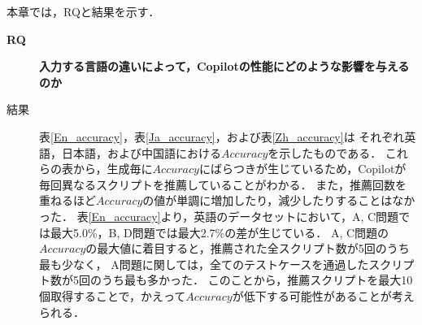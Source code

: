   \begin{table}[t]
    \centering
    \caption{中国語における$Accuracy$}
    \label{Zh_accuracy}
  \end{table}

  本章では，RQと結果を示す．
  \begin{description}
    \item[\textbf{RQ}] \textbf{入力する言語の違いによって，Copilotの性能にどのような影響を与えるのか}
      \item[結果]
      表\ref{En_accuracy}，表\ref{Ja_accuracy}，および表\ref{Zh_accuracy}は
      それぞれ英語，日本語，および中国語における$Accuracy$を示したものである．
      これらの表から，生成毎に$Accuracy$にばらつきが生じているため，Copilotが毎回異なるスクリプトを推薦していることがわかる．
      また，推薦回数を重ねるほど$Accuracy$の値が単調に増加したり，減少したりすることはなかった．
      表\ref{En_accuracy}より，英語のデータセットにおいて，A, C問題では最大5.0\%，B, D問題では最大2.7\%の差が生じている．
      A, C問題の$Accuracy$の最大値に着目すると，推薦された全スクリプト数が5回のうち最も少なく，
      A問題に関しては，全てのテストケースを通過したスクリプト数が5回のうち最も多かった．
      このことから，推薦スクリプトを最大10個取得することで，かえって$Accuracy$が低下する可能性があることが考えられる．
      
      
      
  \end{description}